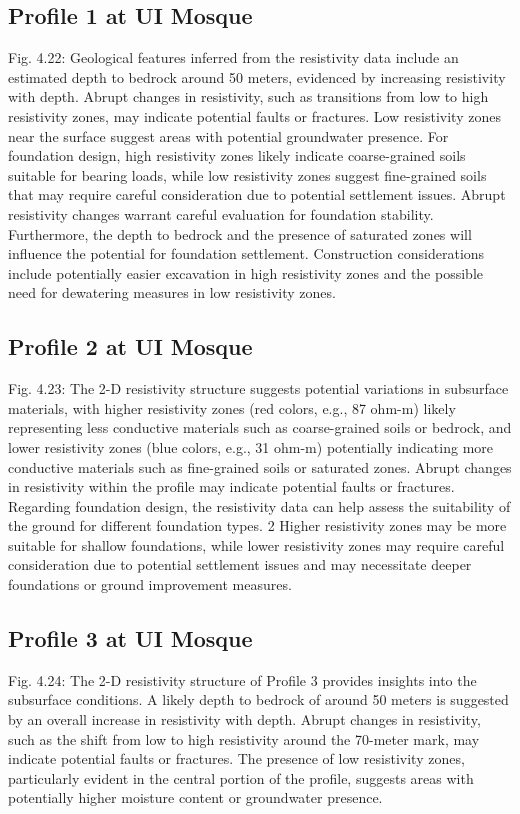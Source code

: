 \documentclass[12pt,a4paper]{report}
\begin{document}
\subsection{Profile 1 at UI Mosque}
Fig.  4.22: Geological features inferred from the resistivity data include an estimated depth to bedrock around 50 meters, evidenced by increasing resistivity with depth. Abrupt changes in resistivity, such as transitions from low to high resistivity zones, may indicate potential faults or fractures. Low resistivity zones near the surface suggest areas with potential groundwater presence. For foundation design, high resistivity zones likely indicate coarse-grained soils suitable for bearing loads, while low resistivity zones suggest fine-grained soils that may require careful consideration due to potential settlement issues. Abrupt resistivity changes warrant careful evaluation for foundation stability. Furthermore, the depth to bedrock and the presence of saturated zones will influence the potential for foundation settlement. Construction considerations include potentially easier excavation in high resistivity zones and the possible need for dewatering measures in low resistivity zones.

\subsection{Profile 2 at UI Mosque}
Fig. 4.23: The 2-D resistivity structure suggests potential variations in subsurface materials, with higher resistivity zones (red colors, e.g., 87 ohm-m) likely representing less conductive materials such as coarse-grained soils or bedrock, and lower resistivity zones (blue colors, e.g., 31 ohm-m) potentially indicating more conductive materials such as fine-grained soils or saturated zones. Abrupt changes in resistivity within the profile may indicate potential faults or fractures. Regarding foundation design, the resistivity data can help assess the suitability of the ground for different foundation types. 2  Higher resistivity zones may be more suitable for shallow foundations, while lower resistivity zones may require careful consideration due to potential settlement issues and may necessitate deeper foundations or ground improvement measures.

\subsection{Profile 3 at UI Mosque}
Fig. 4.24: The 2-D resistivity structure of Profile 3 provides insights into the subsurface conditions. A likely depth to bedrock of around 50 meters is suggested by an overall increase in resistivity with depth. Abrupt changes in resistivity, such as the shift from low to high resistivity around the 70-meter mark, may indicate potential faults or fractures. The presence of low resistivity zones, particularly evident in the central portion of the profile, suggests areas with potentially higher moisture content or groundwater presence.
\end{document}
